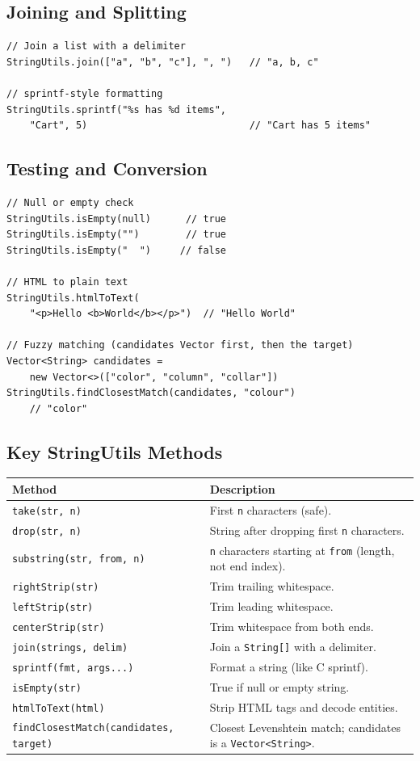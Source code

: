 \subsection{Joining and Splitting}

\begin{lstlisting}[style=groovy]
// Join a list with a delimiter
StringUtils.join(["a", "b", "c"], ", ")   // "a, b, c"

// sprintf-style formatting
StringUtils.sprintf("%s has %d items",
    "Cart", 5)                            // "Cart has 5 items"
\end{lstlisting}

\subsection{Testing and Conversion}

\begin{lstlisting}[style=groovy]
// Null or empty check
StringUtils.isEmpty(null)      // true
StringUtils.isEmpty("")        // true
StringUtils.isEmpty("  ")     // false

// HTML to plain text
StringUtils.htmlToText(
    "<p>Hello <b>World</b></p>")  // "Hello World"

// Fuzzy matching (candidates Vector first, then the target)
Vector<String> candidates =
    new Vector<>(["color", "column", "collar"])
StringUtils.findClosestMatch(candidates, "colour")
    // "color"
\end{lstlisting}

\subsection{Key StringUtils Methods}

\begin{longtable}{P{4.8cm}P{5.7cm}}
\toprule
\textbf{Method} & \textbf{Description} \\
\midrule
\endhead
\texttt{take(str, n)} & First \texttt{n} characters (safe). \\
\texttt{drop(str, n)} & String after dropping first \texttt{n} characters. \\
\texttt{substring(str, from, n)} & \texttt{n} characters starting at \texttt{from} (length, not end index). \\
\texttt{rightStrip(str)} & Trim trailing whitespace. \\
\texttt{leftStrip(str)} & Trim leading whitespace. \\
\texttt{centerStrip(str)} & Trim whitespace from both ends. \\
\texttt{join(strings, delim)} & Join a \texttt{String[]} with a delimiter. \\
\texttt{sprintf(fmt, args...)} & Format a string (like C sprintf). \\
\texttt{isEmpty(str)} & True if null or empty string. \\
\texttt{htmlToText(html)} & Strip HTML tags and decode entities. \\
\texttt{findClosestMatch(\allowbreak candidates, target)} & Closest Levenshtein match; candidates is a \texttt{Vector<String>}. \\
\bottomrule
\end{longtable}


